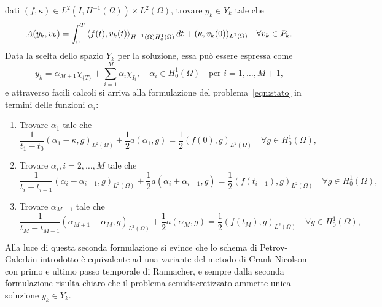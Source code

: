dati $(f,\kappa)\in L^2(I,H^{-1}(\Omega))\times L^2(\Omega)$, trovare $y_k\in Y_k$ tale che 
\begin{equation}
\label{eqn:stato}
A(y_k,v_k)=\int^{T}_{0} \Braket{f(t),v_k(t)}_{H^{-1}(\Omega)H^1_0(\Omega)}dt + (\kappa,v_k(0))_{L^2(\Omega)}\quad \forall v_k\in P_k.
\end{equation}
Data la scelta dello spazio $Y_k$ per la soluzione, essa può essere espressa come 
\[
y_k=\alpha_{M+1}\chi_{\{T\}} + \sum^M_{i=1} \alpha_i\chi_{I_i},\quad \alpha_i\in H^1_0(\Omega)\quad\text{per $i=1,\dots,M+1$},
\]
e attraverso facili calcoli si arriva alla formulazione del problema~\eqref{eqn:stato} in termini delle funzioni $\alpha_i$:
\begin{enumerate}
\item Trovare $\alpha_1$ tale che
\begin{equation}
\label{eqn:stato1}
\frac{1}{t_1-t_0}(\alpha_1-\kappa,g)_{L^2(\Omega)} + \frac{1}{2}a(\alpha_1,g)=\frac{1}{2}(f(0),g)_{L^2(\Omega)}\quad \forall g\in H^1_0(\Omega),
\end{equation}
\item Trovare $\alpha_i,i=2,\dots,M$ tale che 
\begin{equation}
\label{eqn:stato2}
 \frac{1}{t_i-t_{i-1}}(\alpha_i-\alpha_{i-1},g)_{L^2(\Omega)} + \frac{1}{2}a(\alpha_i+\alpha_{i+1},g)=\frac{1}{2}(f(t_{i-1}),g)_{L^2(\Omega)}\quad \forall g\in H^1_0(\Omega),
 \end{equation}
 \item Trovare $\alpha_{M+1}$ tale che 
\begin{equation}
\label{eqn:stato3}
\frac{1}{t_{M}-t_{M-1}}(\alpha_{M+1}-\alpha_M,g)_{L^2(\Omega)} + \frac{1}{2}a(\alpha_M,g)=\frac{1}{2}(f(t_{M}),g)_{L^2(\Omega)}\quad \forall g\in H^1_0(\Omega),
\end{equation}
\end{enumerate}
Alla luce di questa seconda formulazione si evince che lo schema di Petrov-Galerkin introdotto è equivalente ad una variante del metodo di Crank-Nicolson con primo e ultimo passo temporale di Rannacher, e sempre dalla seconda formulazione risulta chiaro che il problema semidiscretizzato ammette unica soluzione $y_k\in Y_k$.

